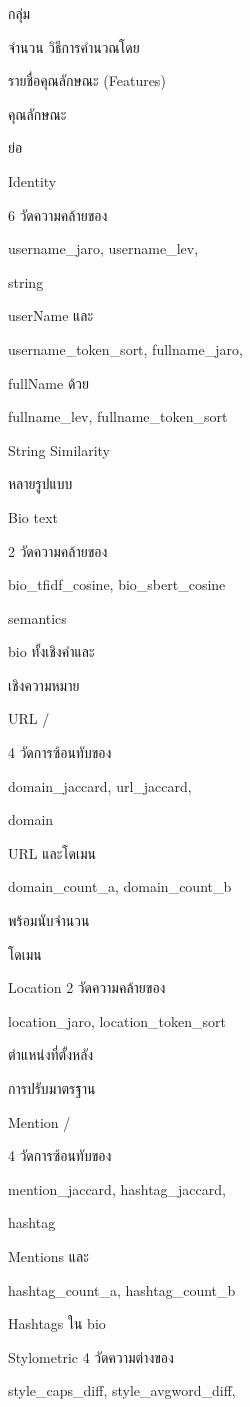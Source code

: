 \documentclass[12pt,a4paper]{report}
\begin{document}
กลุ่ม\par
จำนวน วิธีการคำนวณโดย\par
รายชื่อคุณลักษณะ (Features)\par
คุณลักษณะ\par
ย่อ\par
Identity\par
6 วัดความคล้ายของ\par
username\_jaro, username\_lev,\par
string\par
userName และ\par
username\_token\_sort, fullname\_jaro,\par
fullName ด้วย\par
fullname\_lev, fullname\_token\_sort\par
String Similarity\par
หลายรูปแบบ\par
Bio text\par
2 วัดความคล้ายของ\par
bio\_tfidf\_cosine, bio\_sbert\_cosine\par
semantics\par
bio ทั้งเชิงคำและ\par
เชิงความหมาย\par
URL /\par
4 วัดการซ้อนทับของ\par
domain\_jaccard, url\_jaccard,\par
domain\par
URL และโดเมน\par
domain\_count\_a, domain\_count\_b\par
พร้อมนับจำนวน\par
โดเมน\par
Location 2 วัดความคล้ายของ\par
location\_jaro, location\_token\_sort\par
ตำแหน่งที่ตั้งหลัง\par
การปรับมาตรฐาน\par
Mention /\par
4 วัดการซ้อนทับของ\par
mention\_jaccard, hashtag\_jaccard,\par
hashtag\par
Mentions และ\par
hashtag\_count\_a, hashtag\_count\_b\par
Hashtags ใน bio\par
Stylometric 4 วัดความต่างของ\par
style\_caps\_diff, style\_avgword\_diff,\par
\end{document}
